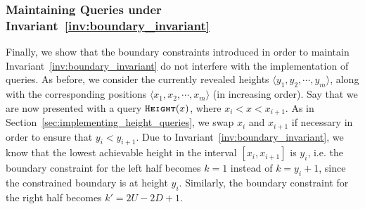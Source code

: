 \subsubsection{Maintaining  Queries under Invariant~\ref{inv:boundary_invariant}}
\label{sec:maintaining_height_queries_under_invariant}
Finally, we show that the boundary constraints introduced in order to maintain Invariant~\ref{inv:boundary_invariant}
do not interfere with the implementation of  queries.
As before, we consider the currently revealed heights $ \langle y_1, y_2,\cdots, y_m \rangle$,
along with the corresponding positions $ \langle x_1, x_2,\cdots, x_m \rangle$ (in increasing order).
Say that we are now presented with a query $\texttt{\textsc{Height}}(x)$, where $x_i < x < x_{i+1}$.
As in Section~\ref{sec:implementing_height_queries}, we swap $x_i$ and $x_{i+1}$ if necessary in order to ensure that $y_i < y_{i+1}$.
Due to Invariant~\ref{inv:boundary_invariant}, we know that the lowest achievable height in the interval $[x_i, x_{i+1}]$ is $y_i$,
i.e. the boundary constraint for the left half becomes $k = 1$ instead of $k = y_i + 1$, since the constrained boundary is at height $y_i$.
Similarly, the boundary constraint for the right half becomes $k' = 2U - 2D + 1$.

